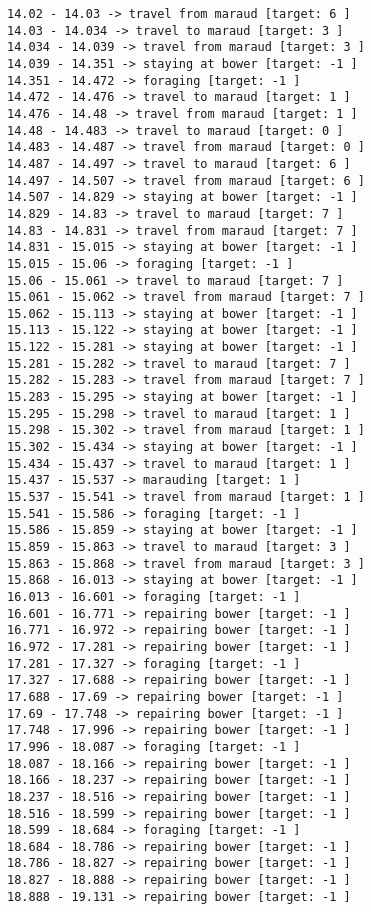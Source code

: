 \documentclass[11pt]{article}
\begin{document}
\begin{Verbatim}[commandchars=\\\{\}]
14.02 - 14.03 -> travel from maraud [target: 6 ]
14.03 - 14.034 -> travel to maraud [target: 3 ]
14.034 - 14.039 -> travel from maraud [target: 3 ]
14.039 - 14.351 -> staying at bower [target: -1 ]
14.351 - 14.472 -> foraging [target: -1 ]
14.472 - 14.476 -> travel to maraud [target: 1 ]
14.476 - 14.48 -> travel from maraud [target: 1 ]
14.48 - 14.483 -> travel to maraud [target: 0 ]
14.483 - 14.487 -> travel from maraud [target: 0 ]
14.487 - 14.497 -> travel to maraud [target: 6 ]
14.497 - 14.507 -> travel from maraud [target: 6 ]
14.507 - 14.829 -> staying at bower [target: -1 ]
14.829 - 14.83 -> travel to maraud [target: 7 ]
14.83 - 14.831 -> travel from maraud [target: 7 ]
14.831 - 15.015 -> staying at bower [target: -1 ]
15.015 - 15.06 -> foraging [target: -1 ]
15.06 - 15.061 -> travel to maraud [target: 7 ]
15.061 - 15.062 -> travel from maraud [target: 7 ]
15.062 - 15.113 -> staying at bower [target: -1 ]
15.113 - 15.122 -> staying at bower [target: -1 ]
15.122 - 15.281 -> staying at bower [target: -1 ]
15.281 - 15.282 -> travel to maraud [target: 7 ]
15.282 - 15.283 -> travel from maraud [target: 7 ]
15.283 - 15.295 -> staying at bower [target: -1 ]
15.295 - 15.298 -> travel to maraud [target: 1 ]
15.298 - 15.302 -> travel from maraud [target: 1 ]
15.302 - 15.434 -> staying at bower [target: -1 ]
15.434 - 15.437 -> travel to maraud [target: 1 ]
15.437 - 15.537 -> marauding [target: 1 ]
15.537 - 15.541 -> travel from maraud [target: 1 ]
15.541 - 15.586 -> foraging [target: -1 ]
15.586 - 15.859 -> staying at bower [target: -1 ]
15.859 - 15.863 -> travel to maraud [target: 3 ]
15.863 - 15.868 -> travel from maraud [target: 3 ]
15.868 - 16.013 -> staying at bower [target: -1 ]
16.013 - 16.601 -> foraging [target: -1 ]
16.601 - 16.771 -> repairing bower [target: -1 ]
16.771 - 16.972 -> repairing bower [target: -1 ]
16.972 - 17.281 -> repairing bower [target: -1 ]
17.281 - 17.327 -> foraging [target: -1 ]
17.327 - 17.688 -> repairing bower [target: -1 ]
17.688 - 17.69 -> repairing bower [target: -1 ]
17.69 - 17.748 -> repairing bower [target: -1 ]
17.748 - 17.996 -> repairing bower [target: -1 ]
17.996 - 18.087 -> foraging [target: -1 ]
18.087 - 18.166 -> repairing bower [target: -1 ]
18.166 - 18.237 -> repairing bower [target: -1 ]
18.237 - 18.516 -> repairing bower [target: -1 ]
18.516 - 18.599 -> repairing bower [target: -1 ]
18.599 - 18.684 -> foraging [target: -1 ]
18.684 - 18.786 -> repairing bower [target: -1 ]
18.786 - 18.827 -> repairing bower [target: -1 ]
18.827 - 18.888 -> repairing bower [target: -1 ]
18.888 - 19.131 -> repairing bower [target: -1 ]

\end{Verbatim}
\end{document}
